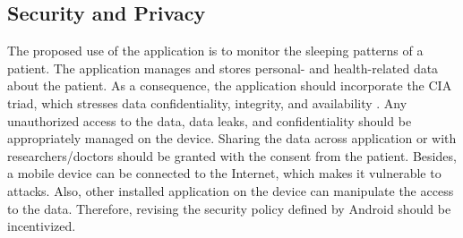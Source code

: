 \subsection{Security and Privacy}
The proposed use of the application is to monitor the sleeping patterns of a patient. The application manages and stores personal- and health-related data about the patient. As a consequence, the application should incorporate the CIA triad, which stresses data confidentiality, integrity, and availability \cite{cia}. Any unauthorized access to the data, data leaks, and confidentiality should be appropriately managed on the device. Sharing the data across application or with researchers/doctors should be granted with the consent from the patient.  Besides, a mobile device can be connected to the Internet, which makes it vulnerable to attacks. Also, other installed application on the device can manipulate the access to the data. Therefore, revising the security policy defined by Android \cite{androidsecurity} should be incentivized. 